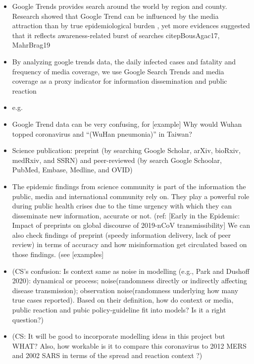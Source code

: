 \begin{itemize}
\item{Google Trends provides search around the world by region and county.  Research showed that Google Trend can be influenced by the media attraction than by true epidemiological burden \citep{}, yet more evidences suggested that it reflects awareness-related burst of searches citep{BousAgac17, MahrBrag19}}
\item{By analyzing google trends data, the daily infected cases and fatality and frequency of media coverage,  we use Google Search Trends and media coverage as a proxy indicator for information dissemination and public reaction  
}
\item{e.g. 
}
\item{Google Trend data can be very confusing, for [example]
Why would Wuhan topped coronavirus and ``(WuHan pneumonia)'' in Taiwan?
}
\end{itemize}

\begin{itemize}
\item{Science publication: preprint (by searching Google Scholar, arXiv, bioRxiv, medRxiv, and SSRN) and peer-reviewed (by search Google Schoolar, PubMed, Embase, Medline, and OVID)}
\item{The epidemic findings from science community is part of the information the public, media and international community rely on. They play a powerful role during public health crises due to the time urgency with which they can disseminate new information, accurate or not. (ref: [Early in the Epidemic: Impact of preprints on global discourse of 2019-nCoV transmissibility]
We can also check findings of preprint (speedy information delivery, lack of peer review) in terms of accuracy and how misinformation get circulated based on those findings. (see [examples]
}
\item{(CS’s confusion: Is context same as noise in modelling (e.g., Park and Dushoff 2020):  dynamical or process; noise(randomness directly or indirectly affecting disease transmission); observation noise(randomness underlying how many true cases reported).  Based on their definition, how do context or media, public reaction and pubic policy-guideline fit into models?  Is it a right question?)
}
\item{(CS: It will be good to incorporate modelling ideas in this project but WHAT?  Also, how workable is it to compare this coronavirus to 2012 MERS and 2002 SARS in terms of the spread and reaction context ?)
}
\end{itemize}

